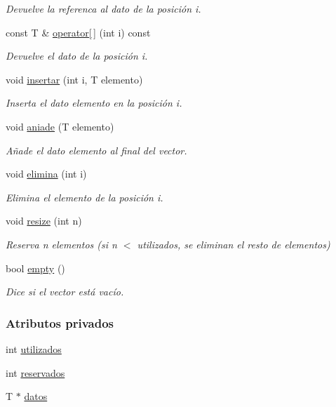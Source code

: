 \begin{DoxyCompactItemize}
\begin{DoxyCompactList}\small\item\em Devuelve la referenca al dato de la posición {\itshape i}. \end{DoxyCompactList}\item 
const T \& \hyperlink{classVectorDinamico_a49ee059bff7d3443235138fff5611d0a}{operator\mbox{[}$\,$\mbox{]}} (int i) const
\begin{DoxyCompactList}\small\item\em Devuelve el dato de la posición {\itshape i}. \end{DoxyCompactList}\item 
void \hyperlink{classVectorDinamico_a09af4a2ad69cd099ff8dc17befca89a0}{insertar} (int i, T elemento)
\begin{DoxyCompactList}\small\item\em Inserta el dato {\itshape elemento} en la posición {\itshape i}. \end{DoxyCompactList}\item 
void \hyperlink{classVectorDinamico_a91f46d1d51e0058f456d9ae69ec4e1b8}{aniade} (T elemento)
\begin{DoxyCompactList}\small\item\em Añade el dato {\itshape elemento} al final del vector. \end{DoxyCompactList}\item 
void \hyperlink{classVectorDinamico_a7becfff8694e770512c00d4d5761dcbb}{elimina} (int i)
\begin{DoxyCompactList}\small\item\em Elimina el elemento de la posición {\itshape i}. \end{DoxyCompactList}\item 
void \hyperlink{classVectorDinamico_a9b3fd8907bc3ca9b5bc5775bbb11f867}{resize} (int n)
\begin{DoxyCompactList}\small\item\em Reserva {\itshape n} elementos (si {\itshape n} $<$ {\itshape utilizados}, se eliminan el resto de elementos) \end{DoxyCompactList}\item 
bool \hyperlink{classVectorDinamico_a2402366c111d0b5b23343b53289418fb}{empty} ()
\begin{DoxyCompactList}\small\item\em Dice si el vector está vacío. \end{DoxyCompactList}\end{DoxyCompactItemize}
\subsubsection*{Atributos privados}
\begin{DoxyCompactItemize}
\item 
int \hyperlink{classVectorDinamico_ae27af4a21ba39afd1fb82f9b255e05f5}{utilizados}
\item 
int \hyperlink{classVectorDinamico_acb164c7ce16a21d4acd50eee38567b89}{reservados}
\item 
T $\ast$ \hyperlink{classVectorDinamico_abd9fcbd41bec3f3644ef89ce7b58ffe0}{datos}
\end{DoxyCompactItemize}


